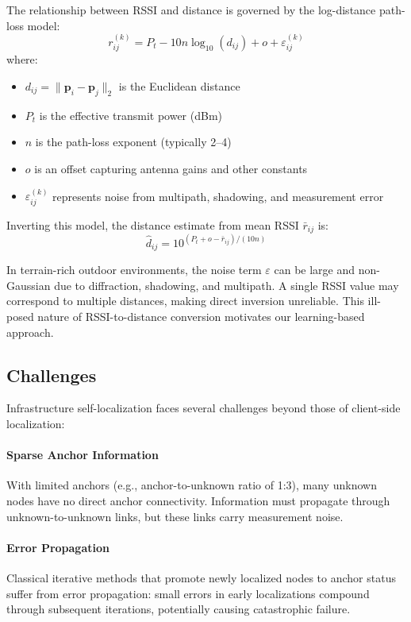 \documentclass[master,final,11pt]{iscs-thesis}
\begin{document}
The relationship between RSSI and distance is governed by the log-distance path-loss model:
\begin{equation}
    r_{ij}^{(k)} = P_t - 10n \log_{10}(d_{ij}) + o + \varepsilon_{ij}^{(k)}
    \label{eq:pathloss_infra}
\end{equation}
where:
\begin{itemize}
    \item $d_{ij} = \|\mathbf{p}_i - \mathbf{p}_j\|_2$ is the Euclidean distance
    \item $P_t$ is the effective transmit power (dBm)
    \item $n$ is the path-loss exponent (typically 2--4)
    \item $o$ is an offset capturing antenna gains and other constants
    \item $\varepsilon_{ij}^{(k)}$ represents noise from multipath, shadowing, and measurement error
\end{itemize}

Inverting this model, the distance estimate from mean RSSI $\bar{r}_{ij}$ is:
\begin{equation}
    \hat{d}_{ij} = 10^{(P_t + o - \bar{r}_{ij}) / (10n)}
    \label{eq:rssi_to_distance}
\end{equation}

In terrain-rich outdoor environments, the noise term $\varepsilon$ can be large and non-Gaussian due to diffraction, shadowing, and multipath.
A single RSSI value may correspond to multiple distances, making direct inversion unreliable.
This ill-posed nature of RSSI-to-distance conversion motivates our learning-based approach.

\subsection{Challenges}

Infrastructure self-localization faces several challenges beyond those of client-side localization:

\paragraph{Sparse Anchor Information}
With limited anchors (e.g., anchor-to-unknown ratio of 1:3), many unknown nodes have no direct anchor connectivity.
Information must propagate through unknown-to-unknown links, but these links carry measurement noise.

\paragraph{Error Propagation}
Classical iterative methods that promote newly localized nodes to anchor status suffer from error propagation: small errors in early localizations compound through subsequent iterations, potentially causing catastrophic failure.
\end{document}
